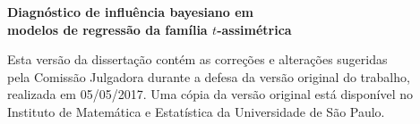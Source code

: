 \documentclass[12pt,twoside,a4paper]{book}
\begin{document}
%
%
%
%
%
%


%
%
%
%

 \newpage
 \thispagestyle{empty}
     \begin{center}
         \vspace*{2.3 cm}
         \textbf{\Large{Diagnóstico de influência bayesiano em \\modelos de regressão da família $t$-assimétrica}}\\
         \vspace*{2 cm}
     \end{center}

\vskip 2cm

     \begin{flushright}
 	Esta versão da dissertação contém as correções e alterações sugeridas\\
 	pela Comissão Julgadora durante a defesa da versão original do trabalho,\\
 	realizada em 05/05/2017. Uma cópia da versão original está disponível no\\
 	Instituto de Matemática e Estatística da Universidade de São Paulo.

     \vskip 2cm

     \end{flushright}
     \vskip 4.2cm
\end{document}
